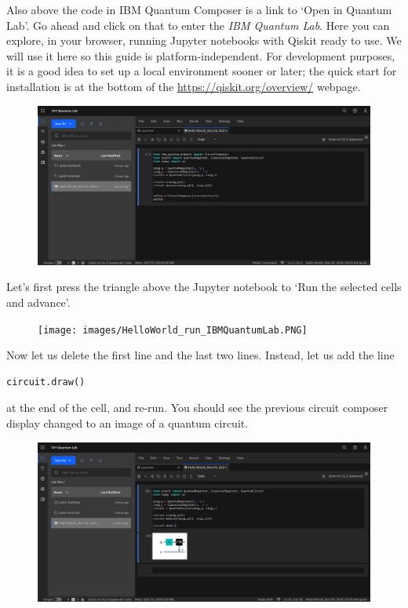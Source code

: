 \documentclass{article}
\theoremstyle{definition}
\begin{document}
Also above the code in IBM Quantum Composer is a link to `Open in Quantum Lab'.  Go ahead and click on that to enter the \textit{IBM Quantum Lab}.  Here you can explore, in your browser, running Jupyter notebooks with Qiskit ready to use.  We will use it here so this guide is platform-independent.  For development purposes, it is a good idea to set up a local environment sooner or later; the quick start for installation is at the bottom of the \url{https://qiskit.org/overview/} webpage.
\begin{figure}[H]
	\includegraphics[width=\columnwidth]{images/HelloWorld_IBMQuantumLab.PNG}
\end{figure}

Let's first press the triangle above the Jupyter notebook to `Run the selected cells and advance'.
\begin{figure}[H]
	\texttt{[image: images/HelloWorld\_run\_IBMQuantumLab.PNG]}
\end{figure}
Now let us delete the first line and the last two lines.  Instead, let us add the line
\begin{lstlisting}[language=Python]
	circuit.draw()
\end{lstlisting}
at the end of the cell, and re-run.  You should see the previous circuit composer display changed to an image of a quantum circuit.
\begin{figure}[H]
	\includegraphics[width=\columnwidth]{images/HelloWorld-2_IBMQuantumLab.PNG}
\end{figure}
\end{document}
